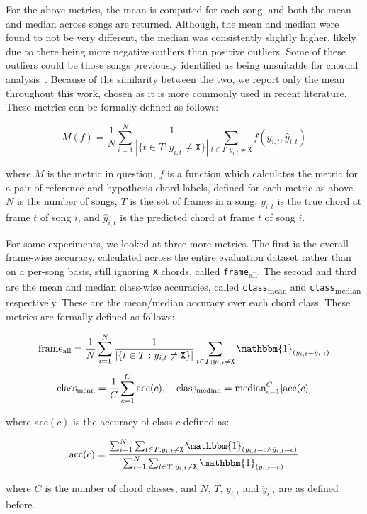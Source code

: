 For the above metrics, the mean is computed for each song, and both the mean and median across songs are returned. Although, the mean and median were found to not be very different, the median was consistently slightly higher, likely due to there being more negative outliers than positive outliers. Some of these outliers could be those songs previously identified as being unsuitable for chordal analysis~\citep{FourTimelyInsights}. Because of the similarity between the two, we report only the mean throughout this work, chosen as it is more commonly used in recent literature. These metrics can be formally defined as follows:

\[ M(f) = \frac{1}{N} \sum_{i=1}^{N} \frac{1}{|\{t\in T : y_{i,t} \neq \texttt{X}\}|} \sum_{t\in T : y_{i,t} \neq \texttt{X}} f(y_{i,t}, \hat{y}_{i,t})\]

where $M$ is the metric in question, $f$ is a function which calculates the metric for a pair of reference and hypothesis chord labels, defined for each metric as above. $N$ is the number of songs, $T$ is the set of frames in a song, $y_{i,t}$ is the true chord at frame $t$ of song $i$, and $\hat{y}_{i,t}$ is the predicted chord at frame $t$ of song $i$.

For some experiments, we looked at three more metrics. The first is the overall frame-wise accuracy, calculated across the entire evaluation dataset rather than on a per-song basis, still ignoring \texttt{X} chords, called \texttt{frame}\textsubscript{all}. The second and third are the mean and median class-wise accuracies, called \texttt{class}\textsubscript{mean} and \texttt{class}\textsubscript{median} respectively. These are the mean/median accuracy over each chord class. These metrics are formally defined as follows:

\[\text{frame}\textsubscript{all} = \frac{1}{N} \sum_{i=1}^{N} \frac{1}{|\{t\in T : y_{i,t} \neq \texttt{X}\}|} \sum_{t\in T : y_{i,t} \neq \texttt{X}} \mathbbm{1}_{(y_{i,t} = \hat{y}_{i,t})}\]
\[
\text{class}\textsubscript{mean} = \frac{1}{C} \sum_{c=1}^{C} \text{acc}(c), \quad
\text{class}\textsubscript{median} = \text{median}_{c=1}^{C} [\text{acc}(c)]
\]

where $\text{acc}(c)$ is the accuracy of class $c$ defined as:

\[\text{acc}(c) = \frac{\sum_{i=1}^{N} \sum_{t\in T : y_{i,t} \neq \texttt{X}} \mathbbm{1}_{(y_{i,t} = c \land \hat{y}_{i,t} = c)}}{\sum_{i=1}^{N} \sum_{t\in T : y_{i,t} \neq \texttt{X}} \mathbbm{1}_{(y_{i,t} = c)}}\]


where $C$ is the number of chord classes, and $N$, $T$, $y_{i,t}$ and $\hat{y}_{i,t}$ are as defined before.

